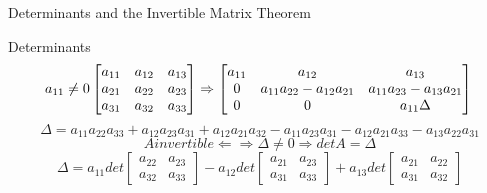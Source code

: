 \documentclass[a4paper, 12pt]{article}
\begin{document}
\begin{section}{Determinants and the Invertible Matrix Theorem}
\begin{subsection}{Determinants}
\begin{equation}
	a_{11}\neq0\\
\begin{bmatrix} a_{11} & a_{12} & a_{13} \\ a_{21} & a_{22} & a_{23}
\\ a_{31} & a_{32} & a_{33} \end{bmatrix} \Rightarrow
\begin{bmatrix} a_{11} & a_{12} & a_{13} \\
0 & a_{11}a_{22}-a_{12}a_{21} & a_{11}a_{23}-a_{13}a_{21} \\
0 & 0 & a_{11}\Delta \end{bmatrix} \\ \\
\end{equation}
\begin{equation}
\Delta=a_{11}a_{22}a_{33}+a_{12}a_{23}a_{31}+a_{12}a_{21}a_{32}-
a_{11}a_{23}a_{31}-a_{12}a_{21}a_{33}-a_{13}a_{22}a_{31}
\end{equation}
\begin{equation}
A invertible \Leftarrow\Rightarrow \Delta\neq0 \Rightarrow detA=\Delta
\end{equation}
\begin{equation}
\Delta = a_{11}det\begin{bmatrix} a_{22} & a_{23}
\\ a_{32} & a_{33} \end{bmatrix} 
-a_{12}det\begin{bmatrix} a_{21} & a_{23} \\ a_{31} & a_{33} 
\end{bmatrix} 
+a_{13}det\begin{bmatrix} a_{21} & a_{22} \\
a_{31} & a_{32} \end{bmatrix} 
\end{equation}


\end{subsection}
\end{section}
\end{document}

